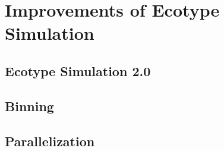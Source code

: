 \chapter{Improvements of Ecotype Simulation}
\section{Ecotype Simulation 2.0}
\section{Binning}
\section{Parallelization}